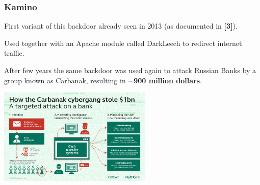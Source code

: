 \begin{frame}
	\frametitle{Kamino}
	
	First variant of this backdoor already seen in 2013 (as documented in \textbf{[3]}).
	
	\medskip
	
	Used together with an Apache module called DarkLeech to redirect internet traffic.
	
	\medskip
	
	After few years the same backdoor was used again to attack Russian Banks by a group known as Carbanak, resulting in \textbf{$\sim$900 million dollars}. 
	
	
   \begin{center}    
   \includegraphics[width=0.55\textwidth]{images/Carbanak}
   \end{center}

\end{frame}
